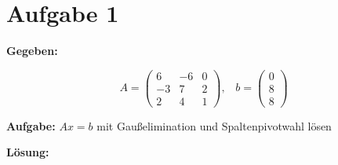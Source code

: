 \section*{Aufgabe 1}
\textbf{Gegeben:}

\[A =
\begin{pmatrix}
    6 & -6 & 0 \\
   -3 & 7  & 2  \\
    2 & 4  & 1
\end{pmatrix}, \;\;\;
b =\begin{pmatrix}
    0 \\
    8 \\
    8
\end{pmatrix}\]

\textbf{Aufgabe:} $Ax = b$ mit Gaußelimination und Spaltenpivotwahl lösen

\textbf{Lösung:}

